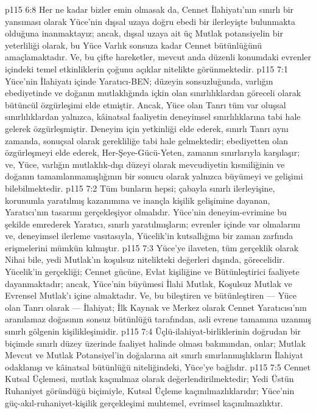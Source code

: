\vs p115 6:8 Her ne kadar bizler emin olmasak da, Cennet İlahiyatı’nın sınırlı bir yansıması olarak Yüce’nin dışsal uzaya doğru ebedi bir ilerleyişte bulunmakta olduğuna inanmaktayız; ancak, dışsal uzaya ait üç Mutlak potansiyelin bir yeterliliği olarak, bu Yüce Varlık sonsuza kadar Cennet bütünlüğünü amaçlamaktadır. Ve, bu çifte hareketler, mevcut anda düzenli konumdaki evrenler içindeki temel etkinliklerin çoğunu açıklar nitelikte görünmektedir.
\vs p115 7:1 Yüce’nin İlahiyatı içinde Yaratıcı\hyp{}BEN; düzeyin sonsuzluğunda, varlığın ebediyetinde ve doğanın mutlaklığında içkin olan sınırlılıklardan göreceli olarak bütüncül özgürleşimi elde etmiştir. Ancak, Yüce olan Tanrı tüm var oluşsal sınırlılıklardan yalnızca, kâinatsal faaliyetin deneyimsel sınırlılıklarına tabi hale gelerek özgürleşmiştir. Deneyim için yetkinliği elde ederek, sınırlı Tanrı aynı zamanda, sonuçsal olarak gerekliliğe tabi hale gelmektedir; ebediyetten olan özgürleşmeyi elde ederek, Her\hyp{}Şeye\hyp{}Gücü\hyp{}Yeten, zamanın sınırlarıyla karşılaşır; ve, Yüce, varlığın mutlaklık\hyp{}dışı düzeyi olarak mevcudiyetin kısmiliğinin ve doğanın tamamlanmamışlığının bir sonucu olarak yalnızca büyümeyi ve gelişimi bilebilmektedir.
\vs p115 7:2 Tüm bunların hepsi; çabayla sınırlı ilerleyişine, korunumla yaratılmış kazanımına ve inançla kişilik gelişimine dayanan, Yaratıcı’nın tasarımı gerçekleşiyor olmalıdır. Yüce’nin deneyim\hyp{}evrimine bu şekilde emrederek Yaratıcı, sınırlı yaratılmışların; evrenler içinde var olmalarını ve, deneyimsel ilerleme vasıtasıyla, Yücelik’in kutsallığına bir zaman zarfında erişmelerini mümkün kılmıştır.
\vs p115 7:3 Yüce’ye ilaveten, tüm gerçeklik olarak Nihai bile, yedi Mutlak’ın koşulsuz nitelikteki değerleri dışında, görecelidir. Yücelik’in gerçekliği; Cennet gücüne, Evlat kişiliğine ve Bütünleştirici faaliyete dayanmaktadır; ancak, Yüce’nin büyümesi İlahi Mutlak, Koşulsuz Mutlak ve Evrensel Mutlak’ı içine almaktadır. Ve, bu bileştiren ve bütünleştiren --- Yüce olan Tanrı olarak --- İlahiyat; İlk Kaynak ve Merkez olarak Cennet Yaratıcısı’nın aranılamaz doğasının sonsuz bütünlüğü tarafından, asli evrene tamamına uzanmış sınırlı gölgenin kişilikleşimidir.
\vs p115 7:4 Üçlü\hyp{}ilahiyat\hyp{}birliklerinin doğrudan bir biçimde sınırlı düzey üzerinde faaliyet halinde olması bakımından, onlar; Mutlak Mevcut ve Mutlak Potansiyel’in doğalarına ait sınırlı sınırlanmışlıkların İlahiyat odaklanışı ve kâinatsal bütünlüğü niteliğindeki, Yüce’ye bağlıdır.
\vs p115 7:5 Cennet Kutsal Üçlemesi, mutlak kaçınılmaz olarak değerlendirilmektedir; Yedi Üstün Ruhaniyet göründüğü biçimiyle, Kutsal Üçleme kaçınılmazlıklarıdır; Yüce’nin güç\hyp{}akıl\hyp{}ruhaniyet\hyp{}kişilik gerçekleşimi muhtemel, evrimsel kaçınılmazlıktır.
